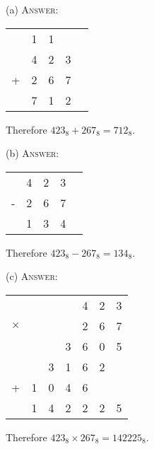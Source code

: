 
(a)
\textsc{Answer:}\vspace{-2mm}
\begin{answerlong}
\begin{longtable}{ccccc}
  & 1 & 1 &   \\
  & 4 & 2 & 3 \\
+ & 2 & 6 & 7 \\ \hline
  & 7 & 1 & 2 \\ \hline
\end{longtable}
Therefore $423_{8} + 267_{8} = 712_{8}$.
\end{answerlong}
  
(b)
\textsc{Answer:}\vspace{-2mm}
\begin{answerlong}
\begin{longtable}{ccccc}
  & 4 & 2 & 3 \\
- & 2 & 6 & 7 \\ \hline
  & 1 & 3 & 4 \\ \hline
\end{longtable}
Therefore $423_{8} - 267_{8} = 134_{8}$.
\end{answerlong}

(c)
\textsc{Answer:}\vspace{-2mm}
\begin{answerlong}
\begin{longtable}{ccccccc}
         &   &   &   & 4 & 2 & 3 \\
$\times$ &   &   &   & 2 & 6 & 7 \\ \hline
         &   &   & 3 & 6 & 0 & 5 \\
         &   & 3 & 1 & 6 & 2 &   \\
+        & 1 & 0 & 4 & 6 &   &   \\ \hline
         & 1 & 4 & 2 & 2 & 2 & 5 \\ \hline
\end{longtable}
Therefore $423_{8} \times 267_{8} = 142225_{8}$.
\end{answerlong}
